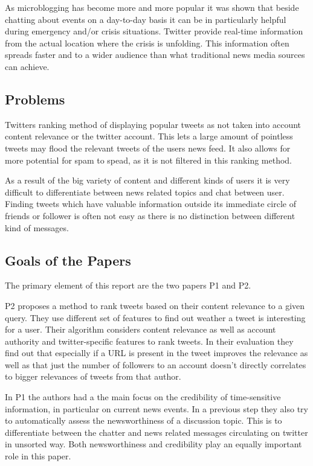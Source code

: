 \documentclass{proseminar}
\let\i\undefined
\newcommand{\i}[1]{\emph{#1}}
\begin{document}
As microblogging has become more and more popular it was shown that beside chatting about events on a day-to-day basis it can be in particularly helpful during emergency and/or crisis situations.
Twitter provide real-time information from the actual location where the crisis is unfolding. This information often spreads faster and to a wider audience than what traditional news media sources can achieve.



\subsection*{Problems}
Twitters ranking method of displaying popular tweets as not taken into account content relevance or the twitter account.
This lets a large amount of pointless tweets may flood the relevant tweets of the users news feed. It also allows for more potential for spam to spead, as it is not filtered in this ranking method.

As a result of the big variety of content and different kinds of users it is very difficult to differentiate between news related topics and chat between user. Finding tweets which have valuable information outside its immediate circle of friends or follower is often not easy as there is no distinction between different kind of messages. 



\subsection*{Goals of the Papers}
The primary element of this report are the two papers P1 and P2.

P2\cite{P2} proposes a method to rank tweets based on their content relevance to a given query. They use different set of features to find out weather a tweet is interesting for a user. Their \i{learning to rank} algorithm considers content relevance as well as account authority and twitter-specific features to rank tweets. In their evaluation they find out that especially if a URL is present in the tweet improves the relevance as well as that just the number of followers to an account doesn't directly correlates to bigger relevances of tweets from that author.

In P1\cite{P1} the authors had a the main focus on the credibility of time-sensitive information, in particular on current news events. In a previous step they also try to automatically assess the newsworthiness of a discussion topic. This is to differentiate between the chatter and news related messages circulating on twitter in unsorted way. Both newsworthiness and credibility play an equally important role in this paper.
\end{document}
